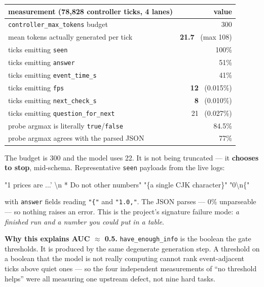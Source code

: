 \documentclass[11pt,a4paper]{article}
\newenvironment{keybox}{\begin{shaded}\noindent}{\end{shaded}}
\begin{document}
\begin{center}\small
\begin{tabular}{lr}
\toprule
measurement (78{,}828 controller ticks, 4 lanes) & value \\
\midrule
\texttt{controller\_max\_tokens} budget & 300 \\
mean tokens actually generated per tick & \textbf{21.7} \ (max 108) \\
ticks emitting \texttt{seen} & 100\% \\
ticks emitting \texttt{answer} & 51\% \\
ticks emitting \texttt{event\_time\_s} & 41\% \\
ticks emitting \texttt{fps} & \textbf{12} \ (0.015\%) \\
ticks emitting \texttt{next\_check\_s} & \textbf{8} \ (0.010\%) \\
ticks emitting \texttt{question\_for\_next} & 21 \ (0.027\%) \\
\midrule
probe argmax is literally \texttt{true}/\texttt{false} & 84.5\% \\
probe argmax agrees with the parsed JSON & 77\% \\
\bottomrule
\end{tabular}
\end{center}

The budget is 300 and the model uses 22. It is not being truncated --- it \textbf{chooses
to stop}, mid-schema. Representative \texttt{seen} payloads from the live logs:

\begin{center}\small\ttfamily
"1 prices are ...' \textbackslash n * Do not other numbers" \quad\textbullet\quad
"\{a single CJK character\}" \quad\textbullet\quad "0\textbackslash n\{"
\end{center}

\noindent with \texttt{answer} fields reading \texttt{"\{"} and \texttt{"1.0,"}. The JSON
parses --- 0\% unparseable --- so nothing raises an error. This is the project's
signature failure mode: \emph{a finished run and a number you could put in a table}.

\begin{keybox}
\textbf{Why this explains AUC $\approx$ 0.5.} \texttt{have\_enough\_info} is the boolean the
gate thresholds. It is produced by the same degenerate generation step. A threshold on a
boolean that the model is not really computing cannot rank event-adjacent ticks above quiet
ones --- so the four independent measurements of ``no threshold helps'' were all measuring
one upstream defect, not nine hard tasks.
\end{keybox}
\end{document}

